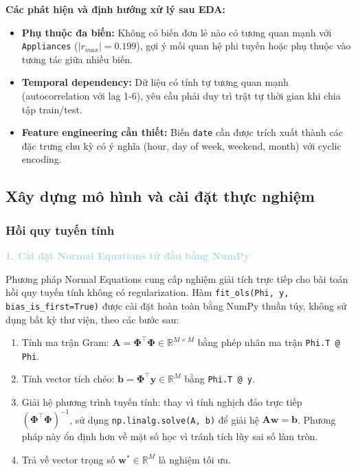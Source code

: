 \noindent\textbf{Các phát hiện và định hướng xử lý sau EDA:}
\begin{itemize}
    \item \textbf{Phụ thuộc đa biến:} Không có biến đơn lẻ nào có tương quan mạnh với \texttt{Appliances} ($|r_{max}| = 0.199$), gợi ý mối quan hệ phi tuyến hoặc phụ thuộc vào tương tác giữa nhiều biến. 

    \item \textbf{Temporal dependency:} Dữ liệu có tính tự tương quan mạnh (autocorrelation với lag 1-6), yêu cầu phải duy trì trật tự thời gian khi chia tập train/test. 

    \item \textbf{Feature engineering cần thiết:} Biến \texttt{date} cần được trích xuất thành các đặc trưng chu kỳ có ý nghĩa (hour, day of week, weekend, month) với cyclic encoding. 
\end{itemize}

\subsection{Xây dựng mô hình và cài đặt thực nghiệm}

\subsubsection{Hồi quy tuyến tính}

\vspace{0.5em}
\noindent\textcolor{lightblue}{\textbf{1. Cài đặt Normal Equations từ đầu bằng NumPy}}
\vspace{0.5em}

Phương pháp Normal Equations cung cấp nghiệm giải tích trực tiếp cho bài toán hồi quy tuyến tính không có regularization. Hàm \texttt{fit\_ols(Phi, y, bias\_is\_first=True)} được cài đặt hoàn toàn bằng NumPy thuần túy, không sử dụng bất kỳ thư viện, theo các bước sau:

\begin{enumerate}
    \item Tính ma trận Gram:
          $\mathbf{A} = \boldsymbol{\Phi}^{\top}\boldsymbol{\Phi} \in \mathbb{R}^{M \times M}$
          bằng phép nhân ma trận \texttt{Phi.T @ Phi}.

    \item Tính vector tích chéo:
          $\mathbf{b} = \boldsymbol{\Phi}^{\top}\mathbf{y} \in \mathbb{R}^{M}$
          bằng \texttt{Phi.T @ y}.

    \item Giải hệ phương trình tuyến tính: thay vì tính nghịch đảo trực tiếp
          $(\boldsymbol{\Phi}^{\top}\boldsymbol{\Phi})^{-1}$, sử dụng
          \texttt{np.linalg.solve(A, b)} để giải hệ $\mathbf{A}\mathbf{w} = \mathbf{b}$.
          Phương pháp này ổn định hơn về mặt số học vì tránh tích lũy sai số làm tròn.

    \item Trả về vector trọng số $\mathbf{w}^* \in \mathbb{R}^{M}$ là nghiệm tối ưu.
\end{enumerate}

